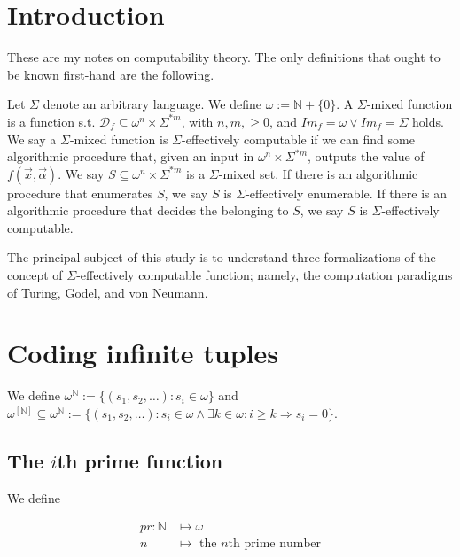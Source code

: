 \documentclass[a4paper, 12pt]{article}
\begin{document}
\section{Introduction}

These are my notes on computability theory. The only definitions that ought to
be known first-hand are the following.

Let $\Sigma$ denote an arbitrary language. We define $\omega := \mathbb{N} + \{
0\}$. A
$\Sigma$-mixed function is a function s.t. $\mathcal{D}_f \subseteq \omega^n
\times \Sigma^{*m}$, with $n, m, \geq 0$, and $Im_f = \omega \lor Im_f = \Sigma$
holds. We say a $\Sigma$-mixed function is $\Sigma$-effectively computable if we
can find some algorithmic procedure that, given an input in $\omega^n \times
\Sigma^{*m}$, outputs the value of $f(\overrightarrow{x},
\overrightarrow{\alpha})$. We say $S \subseteq \omega^n \times \Sigma^{*m}$ is a $\Sigma$-mixed set. If there is an algorithmic procedure that enumerates $S$, we say $S$ is
$\Sigma$-effectively enumerable. If there is an algorithmic procedure that
decides the belonging to $S$, we say $S$ is $\Sigma$-effectively computable.


The principal subject of this study is to understand three formalizations of
the concept of $\Sigma$-effectively computable function; namely, the computation
paradigms of Turing, Godel, and von Neumann.

\pagebreak

\section{Coding infinite tuples}

We define $\omega^{\mathbb{N}} := \{ (s_1, s_2, \ldots) : s_i \in \omega \}$ and
$\omega^{\left[ \mathbb{N} \right] } \subseteq \omega^{\mathbb{N}} := \{(s_1,
s_2, \ldots) : s_i \in \omega \land \exists k \in \omega : i \geq k
\Rightarrow s_i = 0\}$. 

\subsection{The $i$th prime function}

We define 

\begin{align*}
    pr : \mathbb{N} &\mapsto \omega  \\ 
    n &\mapsto \text{ the $n$th prime number}
\end{align*}
\end{document}
